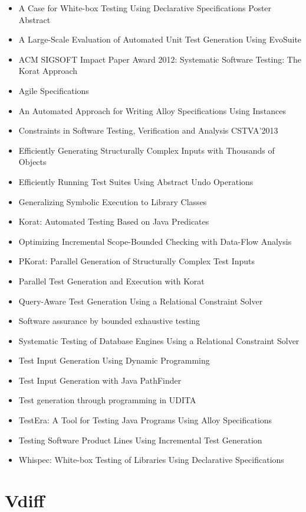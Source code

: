 \begin{itemize}
\item A Case for White-box Testing Using Declarative Specifications Poster Abstract
\item A Large-Scale Evaluation of Automated Unit Test Generation Using EvoSuite
\item ACM SIGSOFT Impact Paper Award 2012: Systematic Software Testing: The Korat Approach
\item Agile Specifications
\item An Automated Approach for Writing Alloy Specifications Using Instances
\item Constraints in Software Testing, Verification and Analysis CSTVA'2013
\item Efficiently Generating Structurally Complex Inputs with Thousands of Objects
\item Efficiently Running Test Suites Using Abstract Undo Operations
\item Generalizing Symbolic Execution to Library Classes
\item Korat: Automated Testing Based on Java Predicates
\item Optimizing Incremental Scope-Bounded Checking with Data-Flow Analysis
\item PKorat: Parallel Generation of Structurally Complex Test Inputs
\item Parallel Test Generation and Execution with Korat
\item Query-Aware Test Generation Using a Relational Constraint Solver
\item Software assurance by bounded exhaustive testing
\item Systematic Testing of Database Engines Using a Relational Constraint Solver
\item Test Input Generation Using Dynamic Programming
\item Test Input Generation with Java PathFinder
\item Test generation through programming in UDITA
\item TestEra: A Tool for Testing Java Programs Using Alloy Specifications
\item Testing Software Product Lines Using Incremental Test Generation
\item Whispec: White-box Testing of Libraries Using Declarative Specifications
\end{itemize}

\section{Vdiff}

